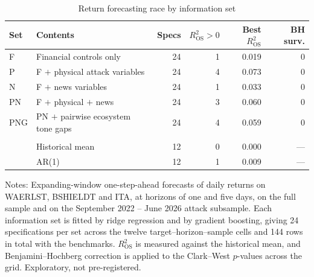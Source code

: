 \documentclass[12pt,a4paper]{article}
\newcommand{\compact}{\setlength{\tabcolsep}{3.5pt}\small}
\begin{document}
\begin{table}[htbp]
\centering
\caption{Return forecasting race by information set}
\label{tab:horserace}
\begin{threeparttable}
\compact
\begin{tabular}{llrrrr}
\toprule
Set & Contents & Specs & $R^2_{\text{OS}}>0$ & Best $R^2_{\text{OS}}$ & BH surv. \\
\midrule
F   & Financial controls only             & 24 & 1 & 0.019 & 0 \\
P   & F $+$ physical attack variables     & 24 & 4 & 0.073 & 0 \\
N   & F $+$ news variables                & 24 & 1 & 0.033 & 0 \\
PN  & F $+$ physical $+$ news             & 24 & 3 & 0.060 & 0 \\
PNG & PN $+$ pairwise ecosystem tone gaps & 24 & 4 & 0.059 & 0 \\
\addlinespace
\multicolumn{2}{l}{\textit{Benchmarks}} & & & & \\
    & Historical mean                     & 12 & 0 & 0.000 & --- \\
    & AR(1)                               & 12 & 1 & 0.009 & --- \\
\bottomrule
\end{tabular}
\begin{tablenotes}
\footnotesize
\item Notes: Expanding-window one-step-ahead forecasts of daily returns on WAERLST, BSHIELDT and ITA, at horizons of one and five days, on the full sample and on the September 2022 -- June 2026 attack subsample. Each information set is fitted by ridge regression and by gradient boosting, giving 24 specifications per set across the twelve target--horizon--sample cells and 144 rows in total with the benchmarks. $R^2_{\text{OS}}$ is measured against the historical mean, and Benjamini--Hochberg correction is applied to the Clark--West $p$-values across the grid. Exploratory, not pre-registered.
\end{tablenotes}
\end{threeparttable}
\end{table}
\end{document}
